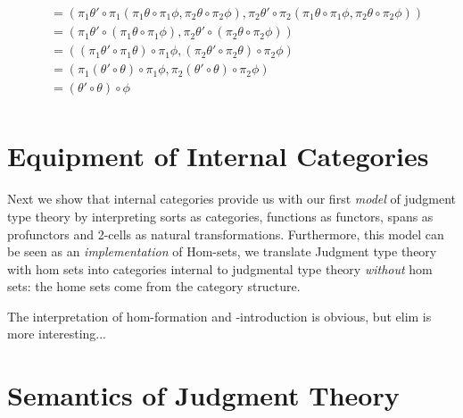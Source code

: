 \documentclass{article}
\begin{document}
\begin{definition}
\begin{enumerate}
\begin{align*}
      &= (\pi_1 \theta' \circ \pi_1(\pi_1 \theta \circ \pi_1 \phi, \pi_2 \theta \circ \pi_2 \phi),
      \pi_2 \theta' \circ \pi_2(\pi_1 \theta \circ \pi_1 \phi, \pi_2 \theta \circ \pi_2 \phi))\\
      &= (\pi_1 \theta' \circ (\pi_1 \theta \circ \pi_1 \phi), \pi_2 \theta' \circ (\pi_2 \theta \circ \pi_2 \phi))\\
      &= ((\pi_1 \theta' \circ \pi_1 \theta) \circ \pi_1 \phi, (\pi_2 \theta' \circ \pi_2 \theta) \circ \pi_2 \phi)\\
      &= (\pi_1(\theta' \circ \theta) \circ \pi_1 \phi, \pi_2(\theta' \circ \theta) \circ \pi_2 \phi)\\
      &= (\theta' \circ \theta) \circ \phi \\
    \end{align*}
  \end{enumerate}
\end{definition}

\section{Equipment of Internal Categories}

Next we show that internal categories provide us with our first
\emph{model} of judgment type theory by interpreting sorts as
categories, functions as functors, spans as profunctors and 2-cells as
natural transformations.
%
Furthermore, this model can be seen as an \emph{implementation} of
Hom-sets, we translate Judgment type theory with hom sets into
categories internal to judgmental type theory \emph{without} hom sets:
the home sets come from the category structure.

The interpretation of hom-formation and -introduction is obvious, but
elim is more interesting...

\section{Semantics of Judgment Theory}
\end{document}
